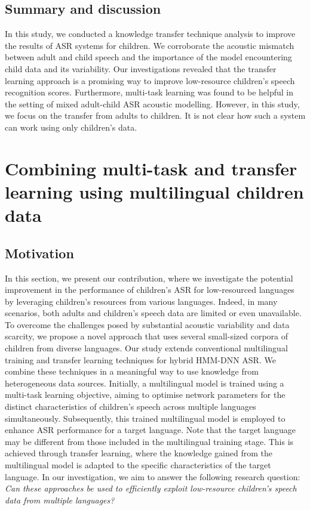 \subsection{Summary and discussion}
In this study, we conducted a knowledge transfer technique analysis to improve the results of ASR systems for children. We corroborate the acoustic mismatch between adult and child speech and the importance of the model encountering child data and its variability. Our investigations revealed that the transfer learning approach is a promising way to improve low-resource children's speech recognition scores. Furthermore, multi-task learning was found to be helpful in the setting of mixed adult-child ASR acoustic modelling.
However, in this study, we focus on the transfer from adults to children. It is not clear how such a system can work using only children's data.



\section{Combining multi-task and transfer learning using multilingual children data}
\subsection{Motivation}
In this section, we present our contribution, where we investigate the potential improvement in the performance of children's ASR for low-resourced languages by leveraging children's resources from various languages. Indeed, in many scenarios, both adults and children's speech data are limited or even unavailable. To overcome the challenges posed by substantial acoustic variability and data scarcity, we propose a novel approach that uses several small-sized corpora of children from diverse languages. Our study extends conventional multilingual training and transfer learning techniques for hybrid HMM-DNN ASR. We combine these techniques in a meaningful way to use knowledge from heterogeneous data sources. Initially, a multilingual model is trained using a multi-task learning objective, aiming to optimise network parameters for the distinct characteristics of children's speech across multiple languages simultaneously. Subsequently, this trained multilingual model is employed to enhance ASR performance for a target language. Note that the target language may be different from those included in the multilingual training stage. This is achieved through transfer learning, where the knowledge gained from the multilingual model is adapted to the specific characteristics of the target language. In our investigation, we aim to answer the following research question: \textit{Can these approaches be used to efficiently exploit low-resource children's speech data from multiple languages?} 

